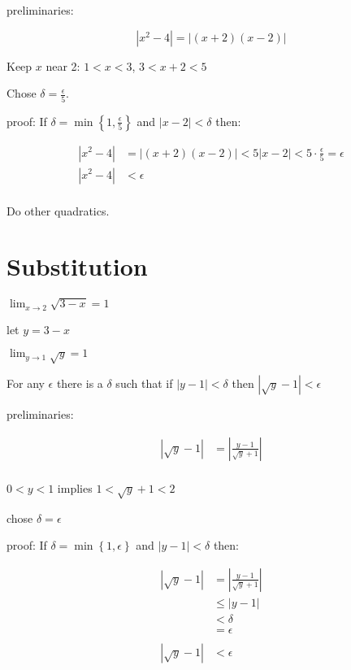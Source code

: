 \documentclass[letterpaper, landscape]{exam}
\begin{document}
  preliminaries:

  \[
    |x^2 - 4| = |(x + 2)(x - 2)|
  \]

  Keep $x$ near 2: $1 < x < 3$, $3 < x + 2 < 5$

  Chose $\delta = \frac{\epsilon}{5}$.

  proof: If $\delta = \min \left\{ 1, \frac{\epsilon}{5} \right\}$ 
  and $|x - 2| < \delta$ then:

  \begin{align*}
    |x^2 - 4| & = |(x + 2)(x - 2)| < 5 |x - 2| 
      < 5 \cdot \frac{\epsilon}{5} = \epsilon \\
    |x^2 - 4| & < \epsilon \\
  \end{align*}

  Do other quadratics.

  \section{Substitution}

  $\lim_{x \to 2} \sqrt{3 - x} = 1$ 

  let $y = 3 - x$

  $\lim_{y \to 1} \sqrt{y} = 1$ 

  For any $\epsilon$ there is a $\delta$ such that if $|y - 1| < \delta$ then
  $|\sqrt{y} - 1| < \epsilon$ 

  preliminaries:

  \begin{align*}
    |\sqrt{y} - 1| &= \left| \frac{y - 1}{\sqrt{y} + 1} \right| \\
  \end{align*}

  $0 < y < 1$ implies $1 < \sqrt{y} + 1 < 2$

  chose $\delta = \epsilon$

  proof: If $\delta = \min \left\{ 1, \epsilon \right\}$ 
  and $|y - 1| < \delta$ then:

  \begin{align*}
    |\sqrt{y} - 1| & = \left| \frac{y - 1}{\sqrt{y} + 1} \right| \\
                   & \leq |y - 1| \\
                   & < \delta \\
                   & = \epsilon \\
    \\
    |\sqrt{y} - 1| & < \epsilon
  \end{align*}
\end{document}
